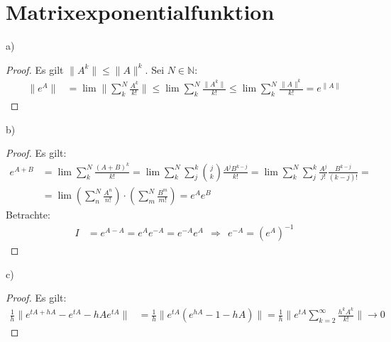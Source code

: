 \documentclass[a4paper,12pt]{article}
\newcommand{\kla}{}
\begin{document}
\section{Matrixexponentialfunktion}
a)
\begin{proof}
Es gilt $\|A^k\|\le\|A\|^k$. Sei $N\in\mathbb{N}$:
\begin{align*}
\|e^A\|&=\lim\Big\|\sum_k^N\frac{A^k}{k!}\Big\|\le\lim\sum_k^N\frac{\|A^k\|}{k!}\le\lim\sum_k^N\frac{\|A\|^k}{k!}= e^{\|A\|}
\end{align*}
\end{proof}
b)
\begin{proof}
Es gilt:
\begin{align*}
e^{A+B}&=\lim\sum_k^N\frac{(A+B)^k}{k!}=\lim\sum_k^N\sum_j^k\binom{j}{k}\frac{A^jB^{k-j}}{k!}=\lim\sum_k^N\sum_j^k\frac{A^j}{j!}\frac{B^{k-j}}{(k-j)!}=\\
&=\lim\kla\left( {\sum_n^N\frac{A^n}{n!}} \right)\cdot\kla\left( {\sum_m^N\frac{B^m}{m!}} \right)=e^Ae^B
\end{align*}
Betrachte:
\begin{align*}
I&=e^{A-A}=e^Ae^{-A}=e^{-A}e^A\ \ \Rightarrow\ \ e^{-A}=\kla\left( {e^A} \right)^{-1}
\end{align*}
\end{proof}
c)
\begin{proof}
Es gilt:
\begin{align*}
\frac{1}{h}\|e^{tA+hA}-e^{tA}-hAe^{tA}\|&=\frac{1}{h}\|e^{tA}\kla\left( {e^{hA}-1-hA} \right)\|=\frac{1}{h}\|e^{tA}\sum_{k=2}^\infty\frac{h^kA^k}{k!}\|\rightarrow 0
\end{align*}
\end{proof}
\end{document}
